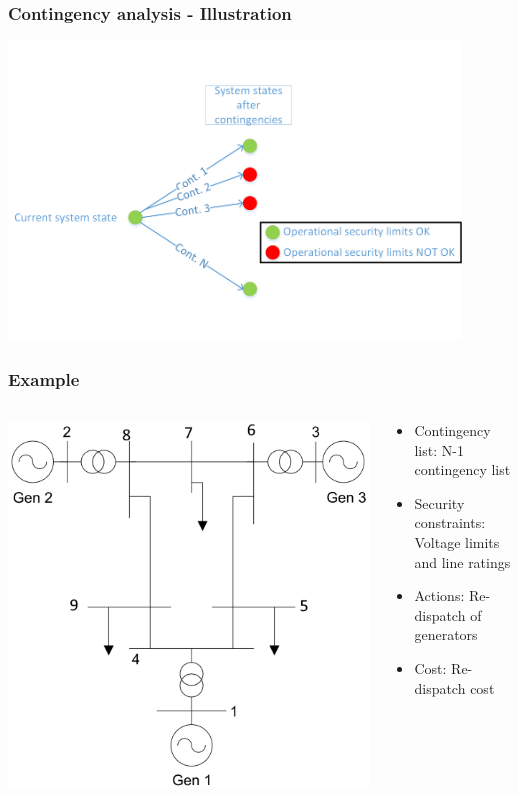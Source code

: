 \documentclass[compress]{beamer}
\begin{document}
\begin{frame}
  \frametitle{Contingency analysis - Illustration}
\includegraphics[width=0.9\textwidth]{Figs/Event-tree-cont-ana.png}
\end{frame}


\begin{frame}
  \frametitle{Example}
  \begin{columns}
    \begin{column}{0.5\textwidth}
\includegraphics[width=\textwidth]{Figs/ieee9.png}
    \end{column}
    \begin{column}{0.5\textwidth}
      \begin{itemize}
      \item Contingency list: N-1 contingency list
      \item Security constraints: Voltage limits and line ratings
      \item Actions: Re-dispatch of generators
      \item Cost: Re-dispatch cost
      \end{itemize}
    \end{column}
  \end{columns}
\end{frame}
\end{document}
